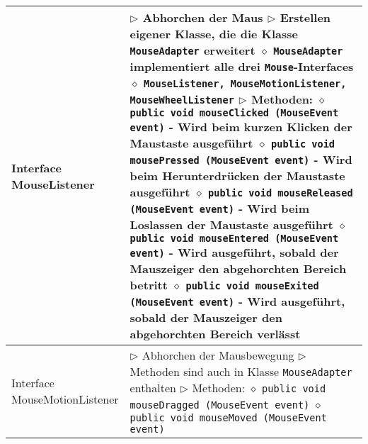 \begin{longtable}{ | p{} p{} | }
	\makecell[l]{Interface \\ MouseListener} & \makecell[l]{
	$\rhd$ Abhorchen der Maus \\
	$\rhd$ Erstellen eigener Klasse, die die Klasse \texttt{MouseAdapter} erweitert \\
	\hspace{0.4cm} $\diamond$ \texttt{MouseAdapter} implementiert alle drei \texttt{Mouse}-Interfaces \\
	\hspace{0.4cm} $\diamond$  \texttt{MouseListener, MouseMotionListener, MouseWheelListener} \\
	$\rhd$ Methoden: \\
	\hspace{0.4cm} $\diamond$ \texttt{public void mouseClicked (MouseEvent event)} \\
	\hspace{0.6cm} - Wird beim kurzen Klicken der Maustaste ausgeführt \\
	\hspace{0.4cm} $\diamond$ \texttt{public void mousePressed (MouseEvent event)} \\	
	\hspace{0.6cm} - Wird beim Herunterdrücken der Maustaste ausgeführt \\
	\hspace{0.4cm} $\diamond$ \texttt{public void mouseReleased (MouseEvent event)} \\
	\hspace{0.6cm} - Wird beim Loslassen der Maustaste ausgeführt \\
	\hspace{0.4cm} $\diamond$ \texttt{public void mouseEntered (MouseEvent event)} \\
	\hspace{0.6cm} - Wird ausgeführt, sobald der Mauszeiger den abgehorchten Bereich betritt \\
	\hspace{0.4cm} $\diamond$ \texttt{public void mouseExited (MouseEvent event)} \\
	\hspace{0.6cm} - Wird ausgeführt, sobald der Mauszeiger den abgehorchten Bereich verlässt} \\ \hline

	\makecell[l]{Interface \\ MouseMotionListener} & \makecell[l]{
	$\rhd$ Abhorchen der Mausbewegung \\
	$\rhd$ Methoden sind auch in Klasse \texttt{MouseAdapter} enthalten \\
	$\rhd$ Methoden: \\
	\hspace{0.4cm} $\diamond$ \texttt{public void mouseDragged (MouseEvent event)} \\
	\hspace{0.4cm} $\diamond$ \texttt{public void mouseMoved (MouseEvent event)}  } \\ \hline


\end{longtable}
